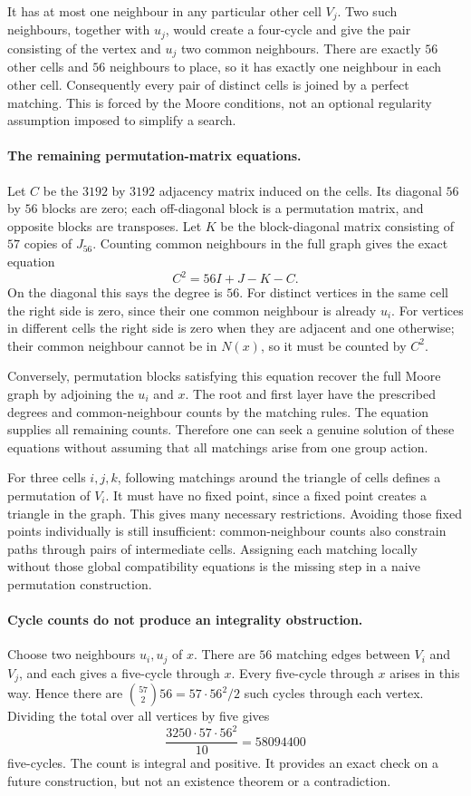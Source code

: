 \documentclass[11pt,a4paper]{article}
\begin{document}
It has at most one neighbour in any particular other cell $V_j$.
Two such neighbours, together with $u_j$, would create a four-cycle
and give the pair consisting of the vertex and $u_j$ two common
neighbours. There are exactly $56$ other cells and $56$ neighbours
to place, so it has exactly one neighbour in each other cell.
Consequently every pair of distinct cells is joined by a perfect
matching. This is forced by the Moore conditions, not an optional
regularity assumption imposed to simplify a search.

\paragraph{The remaining permutation-matrix equations.}
Let $C$ be the $3192$ by $3192$ adjacency matrix induced on the cells.
Its diagonal $56$ by $56$ blocks are zero; each off-diagonal block is
a permutation matrix, and opposite blocks are transposes. Let $K$ be
the block-diagonal matrix consisting of $57$ copies of $J_{56}$.
Counting common neighbours in the full graph gives the exact equation
\[
                         C^2=56I+J-K-C.
\]
On the diagonal this says the degree is $56$. For distinct vertices
in the same cell the right side is zero, since their one common
neighbour is already $u_i$. For vertices in different cells the
right side is zero when they are adjacent and one otherwise; their
common neighbour cannot be in $N(x)$, so it must be counted by $C^2$.

Conversely, permutation blocks satisfying this equation recover the
full Moore graph by adjoining the $u_i$ and $x$. The root and first
layer have the prescribed degrees and common-neighbour counts by the
matching rules. The equation supplies all remaining counts. Therefore
one can seek a genuine solution of these equations without assuming
that all matchings arise from one group action.

For three cells $i,j,k$, following matchings around the triangle of
cells defines a permutation of $V_i$. It must have no fixed point,
since a fixed point creates a triangle in the graph. This gives many
necessary restrictions. Avoiding those fixed points individually is
still insufficient: common-neighbour counts also constrain paths
through pairs of intermediate cells. Assigning each matching locally
without those global compatibility equations is the missing step in
a naive permutation construction.

\paragraph{Cycle counts do not produce an integrality obstruction.}
Choose two neighbours $u_i,u_j$ of $x$. There are $56$ matching edges
between $V_i$ and $V_j$, and each gives a five-cycle through $x$.
Every five-cycle through $x$ arises in this way. Hence there are
$\binom{57}{2}56=57\cdot56^2/2$ such cycles through each vertex.
Dividing the total over all vertices by five gives
\[
                       \frac{3250\cdot57\cdot56^2}{10}
                       =58094400
\]
five-cycles. The count is integral and positive. It provides an exact
check on a future construction, but not an existence theorem or a
contradiction.
\end{document}
